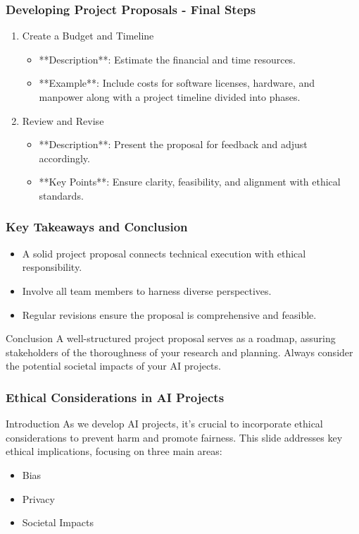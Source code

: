 \documentclass[aspectratio=169]{beamer}
\begin{document}
\begin{frame}[fragile]
    \frametitle{Developing Project Proposals - Final Steps}
    \begin{enumerate}[resume]
        \item Create a Budget and Timeline
        \begin{itemize}
            \item **Description**: Estimate the financial and time resources.
            \item **Example**: Include costs for software licenses, hardware, and manpower along with a project timeline divided into phases.
        \end{itemize}

        \item Review and Revise
        \begin{itemize}
            \item **Description**: Present the proposal for feedback and adjust accordingly.
            \item **Key Points**: Ensure clarity, feasibility, and alignment with ethical standards.
        \end{itemize}
    \end{enumerate}
\end{frame}

\begin{frame}[fragile]
    \frametitle{Key Takeaways and Conclusion}
    \begin{itemize}
        \item A solid project proposal connects technical execution with ethical responsibility.
        \item Involve all team members to harness diverse perspectives.
        \item Regular revisions ensure the proposal is comprehensive and feasible.
    \end{itemize}
    
    \begin{block}{Conclusion}
        A well-structured project proposal serves as a roadmap, assuring stakeholders of the thoroughness of your research and planning. Always consider the potential societal impacts of your AI projects.
    \end{block}
\end{frame}

\begin{frame}[fragile]
    \frametitle{Ethical Considerations in AI Projects}
    \begin{block}{Introduction}
        As we develop AI projects, it’s crucial to incorporate ethical considerations to prevent harm and promote fairness. This slide addresses key ethical implications, focusing on three main areas:
        \begin{itemize}
            \item Bias
            \item Privacy
            \item Societal Impacts
        \end{itemize}
    \end{block}
\end{frame}
\end{document}
